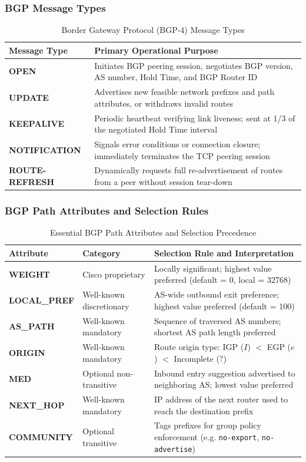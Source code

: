 \subsubsection{BGP Message Types}
\begin{table}[htbp]
\centering
\caption{Border Gateway Protocol (BGP-4) Message Types}
\label{tab:bgp_message_types}
\begin{tabularx}{\textwidth}{p{3.5cm} X}
\toprule
\textbf{Message Type} & \textbf{Primary Operational Purpose} \\
\midrule
\textbf{OPEN} & Initiates BGP peering session, negotiates BGP version, AS number, Hold Time, and BGP Router ID \\
\textbf{UPDATE} & Advertises new feasible network prefixes and path attributes, or withdraws invalid routes \\
\textbf{KEEPALIVE} & Periodic heartbeat verifying link liveness; sent at 1/3 of the negotiated Hold Time interval \\
\textbf{NOTIFICATION} & Signals error conditions or connection closure; immediately terminates the TCP peering session \\
\textbf{ROUTE-REFRESH} & Dynamically requests full re-advertisement of routes from a peer without session tear-down \\
\bottomrule
\end{tabularx}
\end{table}


\subsubsection{BGP Path Attributes and Selection Rules}
\begin{table}[htbp]
\centering
\caption{Essential BGP Path Attributes and Selection Precedence}
\label{tab:bgp_path_attributes}
\begin{tabularx}{\textwidth}{p{3.2cm} p{2.8cm} X}
\toprule
\textbf{Attribute} & \textbf{Category} & \textbf{Selection Rule and Interpretation} \\
\midrule
\textbf{WEIGHT} & Cisco proprietary & Locally significant; highest value preferred (default = 0, local = 32768) \\
\textbf{LOCAL\_PREF} & Well-known discretionary & AS-wide outbound exit preference; highest value preferred (default = 100) \\
\textbf{AS\_PATH} & Well-known mandatory & Sequence of traversed AS numbers; shortest AS path length preferred \\
\textbf{ORIGIN} & Well-known mandatory & Route origin type: IGP ($I$) $<$ EGP ($e$) $<$ Incomplete ($?$) \\
\textbf{MED} & Optional non-transitive & Inbound entry suggestion advertised to neighboring AS; lowest value preferred \\
\textbf{NEXT\_HOP} & Well-known mandatory & IP address of the next router used to reach the destination prefix \\
\textbf{COMMUNITY} & Optional transitive & Tags prefixes for group policy enforcement (e.g. \texttt{no-export}, \texttt{no-advertise}) \\
\bottomrule
\end{tabularx}
\end{table}

